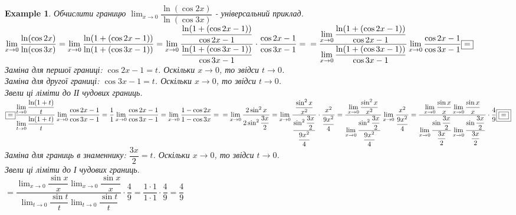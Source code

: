 \documentclass[a4paper, 14pt]{article}
\theoremstyle{theoremdd}
\theoremstyle{theoremdd}
\theoremstyle{theoremdd}
\theoremstyle{theoremdd}
\newtheorem{example}[theorem]{Example}
\theoremstyle{theoremdd}
\theoremstyle{theoremdd}
\theoremstyle{theoremdd}
\theoremstyle{theoremdd}
\begin{document}
\begin{example}
Обчислити границю $\displaystyle\lim_{x \to 0} \dfrac{\ln (\cos 2x)}{\ln (\cos 3x)}$ - універсальний приклад.\\
$\displaystyle\lim_{x \to 0} \dfrac{\ln (\cos 2x)}{\ln (\cos 3x)} = \lim_{x \to 0} \dfrac{\ln (1 + (\cos 2x - 1))}{\ln (1 + (\cos 3x - 1))} = \lim_{x \to 0} \dfrac{\dfrac{\ln (1 + (\cos 2x - 1))}{\cos 2x - 1}}{\dfrac{\ln (1 + (\cos 3x - 1))}{\cos 3x - 1}} \cdot \dfrac{\cos 2x -1}{\cos 3x - 1} = \\ = \dfrac{\displaystyle \lim_{x \to 0} \dfrac{\ln (1 + (\cos 2x - 1))}{\cos 2x - 1}}{\displaystyle \lim_{x \to 0} \dfrac{\ln (1 + (\cos 3x - 1))}{\cos 3x - 1}} \lim_{x \to 0} \dfrac{\cos 2x -1}{\cos 3x - 1} \boxed{=}$\\
Заміна для першої границі: $\cos 2x - 1 = t$. Оскільки $x \to 0$, то звідси $t \to 0$.\\
Заміна для другої границі: $\cos 3x - 1 = t$. Оскільки $x \to 0$, то звідси $t \to 0$.\\
Звели ці ліміти до ІІ чудових границь.\\
$\boxed{=} \displaystyle \dfrac{\displaystyle\lim_{t \to 0} \dfrac{\ln (1+t)}{t}}{\displaystyle \lim_{t \to 0} \dfrac{\ln(1+t)}{t}} \lim_{x \to 0} \dfrac{\cos 2x -1}{\cos 3x - 1} = \dfrac{1}{1} \lim_{x \to 0} \dfrac{\cos 2x -1}{\cos 3x - 1} = \lim_{x \to 0} \dfrac{1 - \cos 2x}{1 - \cos 3x} = \\ = \lim_{x \to 0} \dfrac{2 \sin^2 x}{2 \sin^2 \dfrac{3x}{2}} = \lim_{x \to 0} \dfrac{\dfrac{\sin^2 x}{x^2}}{\dfrac{\sin^2 \dfrac{3x}{2}}{\dfrac{9x^2}{4}}} \cdot \dfrac{x^2}{\dfrac{9x^2}{4}} = \dfrac{\displaystyle \lim_{x \to 0} \dfrac{\sin^2 x}{x^2}}{\displaystyle \lim_{x \to 0} \dfrac{\sin^2 \dfrac{3x}{2}}{\dfrac{9x^2}{4}}} \displaystyle\lim_{x \to 0} \dfrac{x^2}{\dfrac{9x^2}{4}} = \dfrac{\displaystyle \lim_{x \to 0} \dfrac{\sin x}{x} \lim_{x \to 0} \dfrac{\sin x}{x}}{\displaystyle \lim_{x \to 0} \dfrac{\sin \dfrac{3x}{2}}{\dfrac{3x}{2}} \lim_{x \to 0} \dfrac{\sin \dfrac{3x}{2}}{\dfrac{3x}{2}}} \cdot \dfrac{4}{9} \boxed{\boxed{=}}$\\
Заміна для границь в знаменнику: $\dfrac{3x}{2} = t$. Оскільки $x \to 0$, то звідси $t \to 0$.\\
Звели ці ліміти до І чудових границь.\\
$\boxed{\boxed{=}} \dfrac{\displaystyle \lim_{x \to 0} \dfrac{\sin x}{x} \lim_{x \to 0} \dfrac{\sin x}{x}}{\displaystyle \lim_{t \to 0} \dfrac{\sin t}{t} \lim_{t \to 0} \dfrac{\sin t}{t}} \cdot \dfrac{4}{9} = \dfrac{1 \cdot 1}{1 \cdot 1} \cdot \dfrac{4}{9} = \dfrac{4}{9}$
\end{example}
\end{document}
